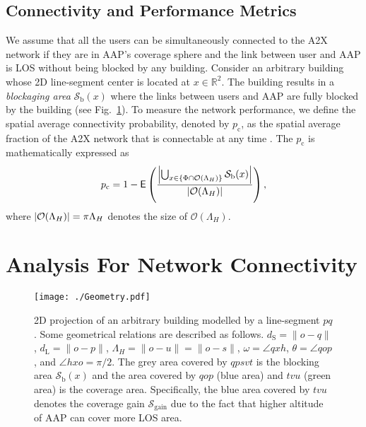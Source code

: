 \documentclass[12pt, draftclsnofoot, onecolumn]{IEEEtran}
\begin{document}
\subsection{Connectivity and Performance Metrics}


We assume that all the users can be simultaneously connected to the A2X network if they are in AAP's coverage sphere and the link between user and AAP is LOS without being blocked by any building. Consider an arbitrary building whose 2D line-segment center is located at $x \in \mathds{R}^2$. The building results in a \emph{blockaging area} $\mathcal{S}_{\textrm{b}}(x)$ where the links between users and AAP are fully blocked by the building (see Fig.~\ref{Geometry}). To measure the network performance, we define the spatial average connectivity probability, denoted by $p_{\textrm{c}}$, as the spatial average fraction of the A2X network that is connectable at any time \cite{28andrews2011tractable}. The $p_{\textrm{c}}$ is mathematically expressed as
\begin{align}\label{Def:CoverageProb}
p_{\textrm{c}} = 1 - \mathsf{E}\left(\frac{\left|\bigcup_{x\in \{\Phi\cap\mathcal{O}(\Lambda_H)\}}\mathcal{S}_{\textrm{b}}(x)\right|}{\left|\mathcal{O}(\Lambda_H)\right|}\right),
\end{align}
where $\left|\mathcal{O}(\Lambda_H)\right| = \pi \Lambda_H$ denotes the size of $\mathcal{O}(\Lambda_H)$.

\section{Analysis For Network Connectivity}


\begin{figure}[t]
\centering
\texttt{[image: ./Geometry.pdf]}
\caption{2D projection of an arbitrary building modelled by a line-segment $pq$. Some geometrical relations are  described as follows. $d_{\textrm{S}}=\|o-q\|$, $d_{\textrm{L}}=\|o-p\|$, $\Lambda_H = \|o-u\| = \|o-s\|$, $\omega = \angle qxh$, $\theta = \angle qop$, and $\angle hxo = \pi/2$. The grey area covered by $qpsvt$ is the blocking area $\mathcal{S}_{\textrm{b}}(x)$ and the area covered by $qop$ (blue area) and $tvu$ (green area) is the coverage area. Specifically, the blue area covered by $tvu$ denotes the coverage gain $\mathcal{S}_{\textrm{gain}}$ due to the fact that higher altitude of AAP can cover more LOS area.}\label{Geometry}
\end{figure}
\end{document}
